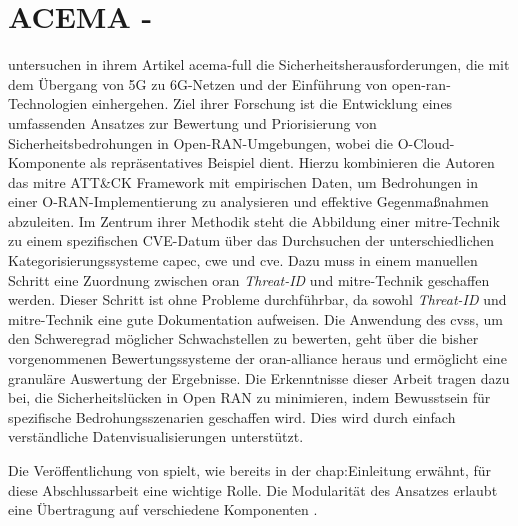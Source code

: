 \section{\glqq{}ACEMA\grqq{} - \citeauthor{klementSecuring6GTransition2024}}
\label{sec:forschungsstand-acema}
\citeauthor{klementSecuring6GTransition2024} untersuchen in ihrem Artikel \gls{acema-full} die Sicherheitsherausforderungen, die mit dem Übergang von 5G zu 6G-Netzen und der Einführung von \gls{open-ran}-Technologien einhergehen. Ziel ihrer Forschung ist die Entwicklung eines umfassenden Ansatzes zur Bewertung und Priorisierung von Sicherheitsbedrohungen in Open-RAN-Umgebungen, wobei die O-Cloud-Komponente als repräsentatives Beispiel dient. Hierzu kombinieren die Autoren das \gls{mitre} ATT\&CK Framework mit empirischen Daten, um Bedrohungen in einer O-RAN-Implementierung zu analysieren und effektive Gegenmaßnahmen  abzuleiten. Im Zentrum ihrer Methodik steht die Abbildung einer \gls{mitre}-Technik zu einem spezifischen CVE-Datum über das Durchsuchen der unterschiedlichen Kategorisierungssysteme \gls{capec}, \gls{cwe} und \gls{cve}. Dazu muss in einem manuellen Schritt eine Zuordnung zwischen \gls{oran} \textit{Threat-ID} und \gls{mitre}-Technik geschaffen werden. Dieser Schritt ist ohne Probleme durchführbar, da sowohl \textit{Threat-ID} und \gls{mitre}-Technik eine gute Dokumentation aufweisen. Die Anwendung des \gls{cvss}, um den Schweregrad möglicher Schwachstellen zu bewerten, geht über die bisher vorgenommenen Bewertungssysteme der \gls{oran-alliance} heraus und ermöglicht eine granuläre Auswertung der Ergebnisse. Die Erkenntnisse dieser Arbeit tragen dazu bei, die Sicherheitslücken in Open RAN zu minimieren, indem Bewusstsein für spezifische Bedrohungsszenarien geschaffen wird. Dies wird durch einfach verständliche Datenvisualisierungen unterstützt.
\par Die Veröffentlichung von \citeauthor{klementSecuring6GTransition2024} spielt, wie bereits in der \refname{chap:Einleitung} erwähnt, für diese Abschlussarbeit eine wichtige Rolle. Die Modularität des Ansatzes erlaubt eine Übertragung auf verschiedene Komponenten \autocite{klementSecuring6GTransition2024}.

%
